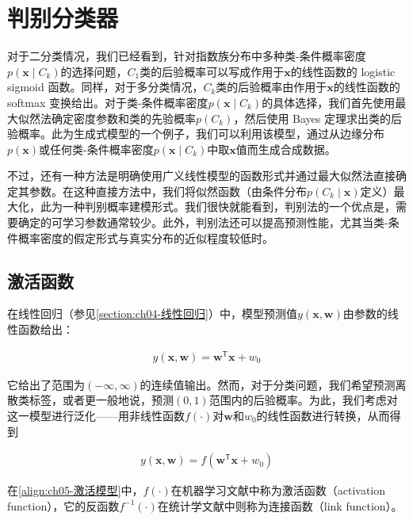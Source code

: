 \documentclass[../../main.tex]{subfiles}
\begin{document}
\section{判别分类器}\label{section:ch05-判别分类器}

对于二分类情况，我们已经看到，针对指数族分布中多种类-条件概率密度$p(\boldsymbol{x}\mid C_k)$的选择问题，$C_1$类的后验概率可以写成作用于$\boldsymbol{x}$的线性函数的 logistic sigmoid 函数。同样，对于多分类情况，$C_k$类的后验概率由作用于$\boldsymbol{x}$的线性函数的 softmax 变换给出。对于类-条件概率密度$p(\boldsymbol{x}\mid C_k)$的具体选择，我们首先使用最大似然法确定密度参数和类的先验概率$p(C_k)$，然后使用 Bayes 定理求出类的后验概率。此为生成式模型的一个例子，我们可以利用该模型，通过从边缘分布$p(\boldsymbol{x})$或任何类-条件概率密度$p(\boldsymbol{x}\mid C_k)$中取$\boldsymbol{x}$值而生成合成数据。

不过，还有一种方法是明确使用广义线性模型的函数形式并通过最大似然法直接确定其参数。在这种直接方法中，我们将似然函数（由条件分布$p(C_k\mid\boldsymbol{x})$定义）最大化，此为一种判别概率建模形式。我们很快就能看到，判别法的一个优点是，需要确定的可学习参数通常较少。此外，判别法还可以提高预测性能，尤其当类-条件概率密度的假定形式与真实分布的近似程度较低时。

\subsection{激活函数}\label{subsection:ch05-激活函数}

在线性回归（参见\cref{section:ch04-线性回归}）中，模型预测值$y(\boldsymbol{x},\boldsymbol{w})$由参数的线性函数给出：

\begin{align}
  y(\boldsymbol{x},\boldsymbol{w})=\boldsymbol{w}^{\mathsf{T}}\boldsymbol{x}+w_0
  \label{align:ch05-线性回归模型}
\end{align}

它给出了范围为$(-\infty,\infty)$的连续值输出。然而，对于分类问题，我们希望预测离散类标签，或者更一般地说，预测$(0,1)$范围内的后验概率。为此，我们考虑对这一模型进行泛化——用非线性函数$f(\cdot)$对$\boldsymbol{w}$和$w_0$的线性函数进行转换，从而得到

\begin{align}
  y(\boldsymbol{x},\boldsymbol{w})=f\left(\boldsymbol{w}^{\mathsf{T}}\boldsymbol{x}+w_0\right)
  \label{align:ch05-激活模型}
\end{align}

\begin{definition}[激活函数与连接函数]\label{definition:ch05-激活函数}
在\eqref{align:ch05-激活模型}中，$f(\cdot)$在机器学习文献中称为激活函数（activation function），它的反函数$f^{-1}(\cdot)$在统计学文献中则称为连接函数（link function）。
\end{definition}
\end{document}
